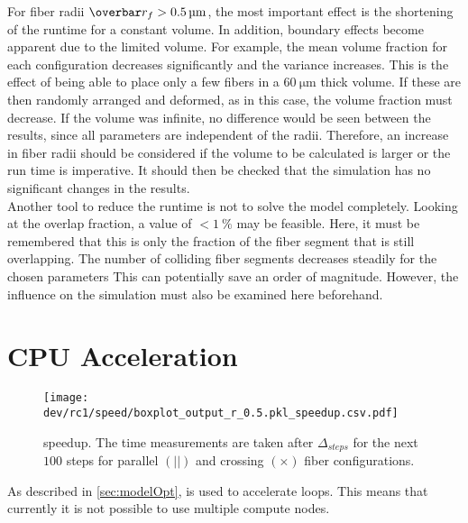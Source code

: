 % 
For fiber radii $\fiberRadiusMean > \SI{0.5}{\micro\meter}$, the most important effect is the shortening of the runtime for a constant volume.
In addition, boundary effects become apparent due to the limited volume.
For example, the mean volume fraction for each configuration decreases significantly and the variance increases.
This is the effect of being able to place only a few fibers in a $\SI{60}{\micro\meter}$ thick volume.
If these are then randomly arranged and deformed, as in this case, the volume fraction must decrease.
If the volume was infinite, no difference would be seen between the results, since all parameters are independent of the radii.
Therefore, an increase in fiber radii should be considered if the volume to be calculated is larger or the run time is imperative.
It should then be checked that the simulation has no significant changes in the results.
\\
% 
Another tool to reduce the runtime is not to solve the model completely. 
Looking at the overlap fraction, a value of $<\SI{1}{\percent}$ may be feasible.
Here, it must be remembered that this is only the fraction of the fiber segment that is still overlapping.
The number of colliding fiber segments decreases steadily for the chosen parameters
This can potentially save an order of magnitude.
However, the influence on the simulation must also be examined here beforehand.
% 
% 
%
% 
\section{CPU Acceleration}
% 
\begin{figure}[!t]
\centering
\texttt{[image: dev/rc1/speed/boxplot\_output\_r\_0.5.pkl\_speedup.csv.pdf]}
\caption[ speedup]{ speedup. The time measurements are taken after $\Delta_{\mathit{steps}}$ for the next $100$ steps for parallel $(||)$ and crossing $(\times)$ fiber configurations. }
\label{fig:solverSpeedup}
\end{figure}
% 
As described in \cref{sec:modelOpt}, \openmp{} is used to accelerate  loops.
This means that currently it is not possible to use multiple compute nodes.
% 
